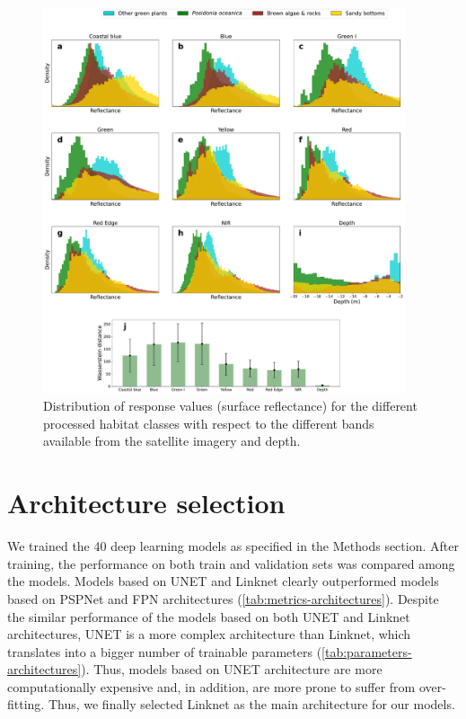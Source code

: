 \begin{figure}[H]
    \centering

    \includegraphics[width=0.95\textwidth]{Figures/Reflectance_histograms_Mallorca_only.pdf}
    \caption{Distribution of response values (surface reflectance) for the
        different processed habitat classes with respect to the different bands
        available from the satellite imagery and depth.}
    \label{fig:reflectance}
\end{figure}

\section{Architecture selection}\label{app:architecture_selection}

We trained the 40 deep learning models as specified in the Methods
section. After training, the performance on both train and validation sets was
compared among the models. Models based on UNET and Linknet clearly
outperformed models based on PSPNet and FPN architectures
(\cref{tab:metrics-architectures}). Despite the similar performance of the
models based on both UNET and Linknet architectures, UNET is a more complex
architecture than Linknet, which translates into a bigger number of trainable
parameters (\cref{tab:parameters-architectures}). Thus, models based on UNET
architecture are more computationally expensive and, in addition, are more
prone to suffer from over-fitting. Thus, we finally selected Linknet as the
main architecture for our models.

